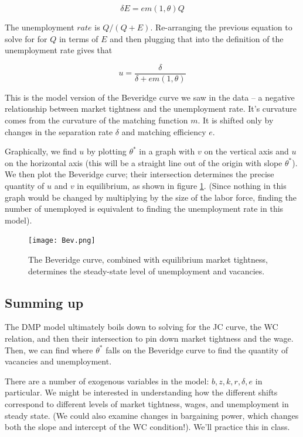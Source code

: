 \documentclass[12pt]{article}
\begin{document}
$$\delta E = em(1,\theta)Q$$

The unemployment $rate$ is $Q/(Q+E)$.  Re-arranging the previous equation to solve for for $Q$ in terms of $E$ and then plugging that into the definition of the unemployment rate gives that

\begin{equation}\label{eq:bev}
	u = \frac{\delta}{\delta + em(1,\theta)} \tag{Beveridge Curve}
\end{equation}

This is the model version of the Beveridge curve we saw in the data -- a negative relationship between market tightness and the unemployment rate.  It's curvature comes from the curvature of the matching function $m$.  It is shifted only by changes in the separation rate $\delta$ and matching efficiency $e$. 

Graphically, we find $u$ by plotting $\theta^*$ in a graph with $v$ on the vertical axis and $u$ on the horizontal axis (this will be a straight line out of the origin with slope $\theta^*$).  We then plot the Beveridge curve; their intersection determines the precise quantity of $u$ and $v$ in equilibrium, as shown in figure \ref{fig:equv}.  (Since nothing in this graph would be changed by multiplying by the size of the labor force, finding the number of unemployed is equivalent to finding the unemployment rate in this model).

\begin{figure}[htb]
\begin{center}
	\texttt{[image: Bev.png]}
\end{center}
\caption{The Beveridge curve, combined with equilibrium market tightness, determines the steady-state level of unemployment and vacancies.}\label{fig:equv}
\end{figure}


\subsection*{Summing up}

The DMP model ultimately boils down to solving for the JC curve, the WC relation, and then their intersection to pin down market tightness and the wage.  Then, we can find where $\theta^*$ falls on the Beveridge curve to find the quantity of vacancies and unemployment. 

There are a number of exogenous variables in the model: $b, z, k, r, \delta, e$ in particular.  We might be interested in understanding how the different shifts correspond to different levels of market tightness, wages, and unemployment in steady state.  (We could also examine changes in bargaining power, which changes both the slope and intercept of the WC condition!).  We'll practice this in class.
\end{document}
